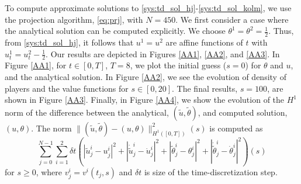 \documentclass[12pt]{amsart}
\newcommand{\1}{{\chi}}
\newcommand{\lb}{\left(}
\newcommand{\rb}{\right)}
\theoremstyle{definition}
\begin{document}
        
        To compute approximate solutions to \eqref{sys:td_sol_hj}-\eqref{sys:td_sol_kolm}, we use the projection algorithm, \eqref{eq:prj}, with $N=450$.
    We first consider a case where the analytical solution can be computed explicitly. We choose 
    $\theta^1=\theta^2=\frac 1 2$. Thus, from \eqref{sys:td_sol_hj}, it follows that  $u^1=u^2$ are affine functions of $t$ with $u^1_t=u^2_t-\frac{1}{2}$. 
    Our results are depicted in Figures \ref{AA1}, \ref{AA2}, and \ref{AA3}.
    In Figure \ref{AA1}, for $t\in[0,T]$, $T=8$, we plot the initial guess ($s=0$) for $\theta$ and $u$, and the analytical solution.
    In Figure \ref{AA2}, we see the evolution of density of players and the value functions for $s\in[0,20]$. The final results, $s=100$, are shown in Figure \ref{AA3}. 
    Finally, in Figure \ref{AA4}, we show the evolution of the $H^1$ norm of the difference between the analytical, $(\tilde u, \tilde \theta)$, and computed solution, $(u,\theta)$.        The norm $\|(\tilde u, \tilde \theta) - (u,\theta) \|_{H^1([0,T])}^2(s)$ is computed as 
    \begin{equation*}
    \sum_{j=0}^{N-1} \sum_{i=1}^2 \delta t \lb|\tilde u^i_j - u^i_j |^2 + |\dot{\tilde{u}}^i_j - \dot u^i_j |^2 
    + |\tilde{\theta}^i_j -\theta^i_j|^2 + |\dot{\tilde{\theta}}^i_j -\dot{\theta}^i_j|^2 \rb(s)
    \end{equation*}
    for $s\geq 0$, where $v^i_j=v^i(t_j,s)$ and $\delta t$ is  size of the time-discretization step.
        
\end{document}
